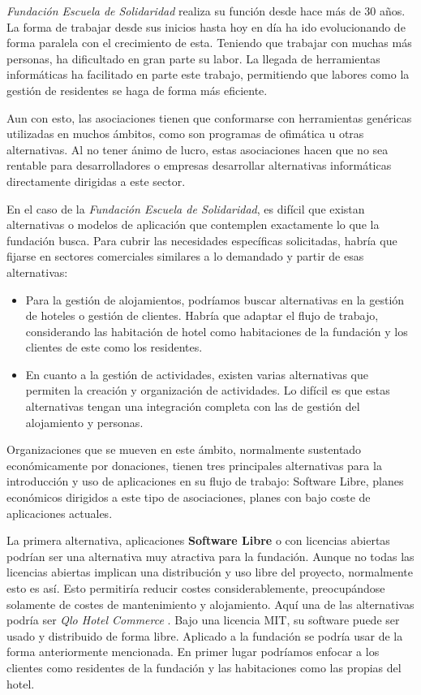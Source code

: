 \textit{Fundación Escuela de Solidaridad} realiza su función desde hace más de 30 años. La forma de trabajar desde sus inicios hasta hoy en día ha ido evolucionando de forma paralela con el crecimiento de esta. Teniendo que trabajar con muchas más personas, ha dificultado en gran parte su labor. La llegada de herramientas informáticas ha facilitado en parte este trabajo, permitiendo que labores como la gestión de residentes se haga de forma más eficiente. 

Aun con esto, las asociaciones tienen que conformarse con herramientas genéricas utilizadas en muchos ámbitos, como son programas de ofimática u otras alternativas. Al no tener ánimo de lucro, estas asociaciones hacen que no sea rentable para desarrolladores o empresas desarrollar alternativas informáticas directamente dirigidas a este sector. 

En el caso de la \textit{Fundación Escuela de Solidaridad}, es difícil que existan alternativas o modelos de aplicación que contemplen exactamente lo que la fundación busca. Para cubrir las necesidades específicas solicitadas, habría que fijarse en sectores comerciales similares a lo demandado y partir de esas alternativas:

\begin{itemize}
    \item Para la gestión de alojamientos, podríamos buscar alternativas en la gestión de hoteles o gestión de clientes. Habría que adaptar el flujo de trabajo, considerando las habitación de hotel como habitaciones de la fundación y los clientes de este como los residentes.
    \item En cuanto a la gestión de actividades, existen varias alternativas que permiten la creación y organización de actividades. Lo difícil es que estas alternativas tengan una integración completa con las de gestión del alojamiento y personas.
\end{itemize}

Organizaciones que se mueven en este ámbito, normalmente sustentado económicamente por donaciones, tienen tres principales alternativas para la introducción y uso de aplicaciones en su flujo de trabajo: Software Libre, planes económicos dirigidos a este tipo de asociaciones, planes con bajo coste de aplicaciones actuales. 

La primera alternativa, aplicaciones \textbf{Software Libre} o con licencias abiertas podrían ser una alternativa muy atractiva para la fundación. Aunque no todas las licencias abiertas implican una distribución y uso libre del proyecto, normalmente esto es así. Esto permitiría reducir costes considerablemente, preocupándose solamente de costes de mantenimiento y alojamiento. Aquí una de las alternativas podría ser \textit{Qlo Hotel Commerce} \cite{qloapps}. Bajo una licencia MIT, su software puede ser usado y distribuido de forma libre. Aplicado a la fundación se podría usar de la forma anteriormente mencionada. En primer lugar podríamos enfocar a los clientes como residentes de la fundación y las habitaciones como las propias del hotel. 


